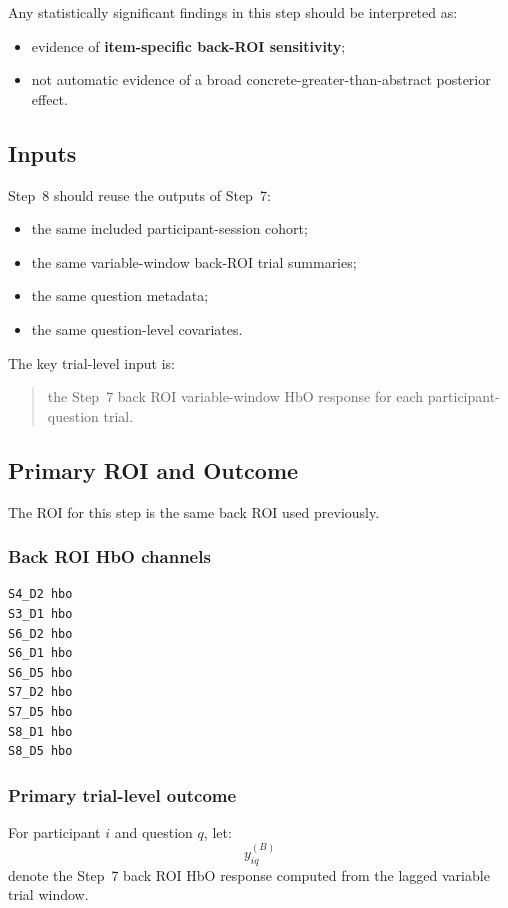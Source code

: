 \documentclass[11pt]{article}
\begin{document}
Any statistically significant findings in this step should be interpreted as:
\begin{itemize}
    \item evidence of \textbf{item-specific back-ROI sensitivity};
    \item not automatic evidence of a broad concrete-greater-than-abstract posterior effect.
\end{itemize}

\subsection{Inputs}
Step~8 should reuse the outputs of Step~7:
\begin{itemize}
    \item the same included participant-session cohort;
    \item the same variable-window back-ROI trial summaries;
    \item the same question metadata;
    \item the same question-level covariates.
\end{itemize}

The key trial-level input is:
\begin{quote}
the Step~7 back ROI variable-window HbO response for each participant-question trial.
\end{quote}

\subsection{Primary ROI and Outcome}
The ROI for this step is the same back ROI used previously.

\subsubsection{Back ROI HbO channels}
\begin{verbatim}
S4_D2 hbo
S3_D1 hbo
S6_D2 hbo
S6_D1 hbo
S6_D5 hbo
S7_D2 hbo
S7_D5 hbo
S8_D1 hbo
S8_D5 hbo
\end{verbatim}

\subsubsection{Primary trial-level outcome}
For participant \(i\) and question \(q\), let:
\begin{equation}
y^{(B)}_{iq}
\end{equation}
denote the Step~7 back ROI HbO response computed from the lagged variable trial window.
\end{document}
